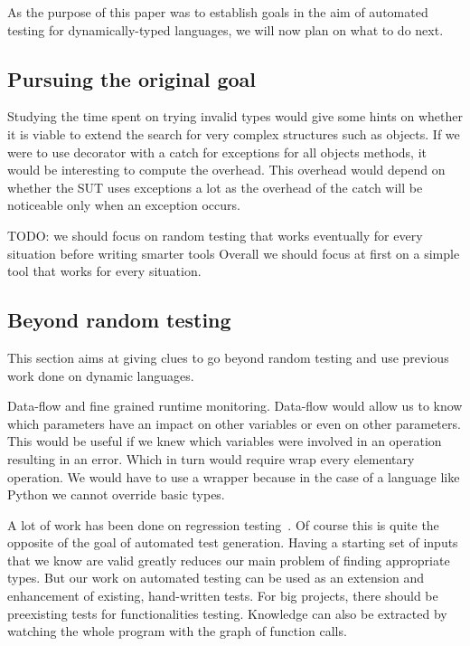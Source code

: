 \documentclass{llncs2e/llncs}
\makeatletter
\def\todo#1{{\color{red}TODO\@: #1}}
\makeatother
\begin{document}
As the purpose of this paper was to establish goals in the aim of automated
testing for dynamically-typed languages, we will now plan on what to do next.

\subsection{Pursuing the original goal}

Studying the time spent on trying invalid types would give some hints on whether
it is viable to extend the search for very complex structures such as objects.
If we were to use decorator with a catch for exceptions for all objects methods,
it would be interesting to compute the overhead. This overhead would depend on
whether the SUT uses exceptions a lot as the overhead of the catch will be
noticeable only when an exception occurs.

\todo{we should focus on random testing that works eventually for every
situation before writing smarter tools}
Overall we should focus at first on a simple tool that works for every
situation.


\subsection{Beyond random testing}

This section aims at giving clues to go beyond random testing and use previous
work done on dynamic languages.

Data-flow and fine grained runtime monitoring. Data-flow would allow us to know
which parameters have an impact on other variables or even on other parameters.
This would be useful if we knew which variables were involved in an operation
resulting in an error. Which in turn would require wrap every elementary
operation. We would have to use a wrapper because in the case of a language like
Python we cannot override basic types.

A lot of work has been done on regression
testing~\cite{gligoric2011smutant,haupt2011type,steinert2010continuous,yoo2012regression}.
Of course this is quite the opposite of the goal of automated test generation.
Having a starting set of inputs that we know are valid greatly reduces our main
problem of finding appropriate types. But our work on automated testing can be
used as an extension and enhancement of existing, hand-written tests.
For big projects, there should be preexisting tests for functionalities testing.
Knowledge can also be extracted by watching the whole program with the graph of
function calls.
\end{document}
